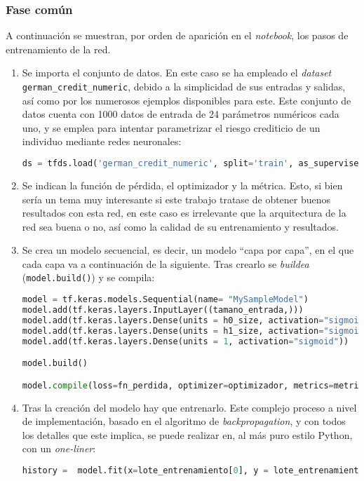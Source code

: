 \subsubsection{Fase común}
\label{sssec:modelo_pruebas_fase_comun}
A continuación se muestran, por orden de aparición en el \textit{notebook}, los pasos de entrenamiento de la red.

\begin{enumerate}
    \item Se importa el conjunto de datos. En este caso se ha empleado el \textit{dataset} \texttt{german\_credit\_numeric}, debido a la simplicidad de sus entradas y salidas, así como por los numerosos ejemplos disponibles para este. Este conjunto de datos cuenta con 1000 datos de entrada de 24 parámetros numéricos cada uno, y se emplea para intentar parametrizar el riesgo crediticio de un individuo mediante redes neuronales:\medskip
\begin{lstlisting}[language=Python]
ds = tfds.load('german_credit_numeric', split='train', as_supervised=True)
\end{lstlisting}

    \item Se indican la función de pérdida, el optimizador y la métrica. Esto, si bien sería un tema muy interesante si este trabajo tratase de obtener buenos resultados con esta red, en este caso es irrelevante que la arquitectura de la red sea buena o no, así como la calidad de su entrenamiento y resultados.

    \item Se crea un modelo secuencial, es decir, un modelo ``capa por capa'', en el que cada capa va a continuación de la siguiente. Tras crearlo se \textit{buildea} (\texttt{model.build()}) y se compila:\medskip
\begin{lstlisting}[language=Python]
model = tf.keras.models.Sequential(name= "MySampleModel")
model.add(tf.keras.layers.InputLayer((tamano_entrada,)))
model.add(tf.keras.layers.Dense(units = h0_size, activation="sigmoid"))
model.add(tf.keras.layers.Dense(units = h1_size, activation="sigmoid"))
model.add(tf.keras.layers.Dense(units = 1, activation="sigmoid"))

model.build()

model.compile(loss=fn_perdida, optimizer=optimizador, metrics=metrica)
\end{lstlisting}

    \item Tras la creación del modelo hay que entrenarlo. Este complejo proceso a nivel de implementación, basado en el algoritmo de \textit{backpropagation}, y con todos los detalles que este implica, se puede realizar en, al más puro estilo Python, con un \textit{one-liner}:\medskip
\begin{lstlisting}[language=Python]
history =  model.fit(x=lote_entrenamiento[0], y = lote_entrenamiento[1], batch_size = 20, epochs=num_epochs)
\end{lstlisting}
\end{enumerate}

